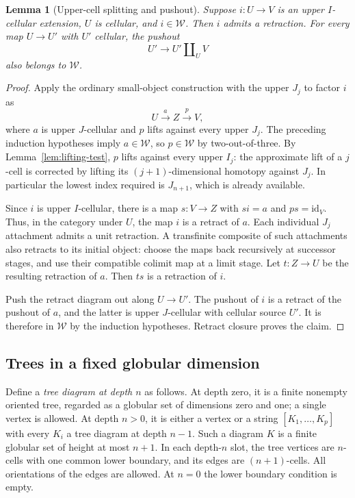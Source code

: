 \documentclass[11pt,letterpaper]{article}
\numberwithin{equation}{section}
\theoremstyle{plain}
\newtheorem{lemma}[theorem]{Lemma}
\theoremstyle{definition}
\theoremstyle{remark}
\newcommand{\id}{\mathrm{id}}
\begin{document}
\begin{lemma}[Upper-cell splitting and pushout]
\label{lem:upper-cell}
Suppose $i:U\to V$ is an upper $I$-cellular extension, $U$ is
cellular, and $i\in\mathcal W$.  Then $i$ admits a retraction.
For every map $U\to U'$ with $U'$ cellular, the pushout
\[
 U'\longrightarrow U'\amalg_U V
\]
also belongs to $\mathcal W$.
\end{lemma}

\begin{proof}
Apply the ordinary small-object construction with the upper
$J_j$ to factor $i$ as
\[
 U\xrightarrow{\,a\,}Z\xrightarrow{\,p\,}V,
\]
where $a$ is upper $J$-cellular and $p$ lifts against every upper
$J_j$.  The preceding induction hypotheses imply $a\in\mathcal W$,
so $p\in\mathcal W$ by two-out-of-three.  By
Lemma~\ref{lem:lifting-test}, $p$ lifts against every upper $I_j$:
the approximate lift of a $j$-cell is corrected by lifting its
$(j+1)$-dimensional homotopy against $J_j$.  In particular the
lowest index required is $J_{n+1}$, which is already available.

Since $i$ is upper $I$-cellular, there is a map $s:V\to Z$ with
$si=a$ and $ps=\id_V$.  Thus, in the category under $U$, the map
$i$ is a retract of $a$.
Each individual $J_j$ attachment admits a unit retraction.  A
transfinite composite of such attachments also retracts to its
initial object: choose the maps back recursively at successor
stages, and use their compatible colimit map at a limit stage.
Let $t:Z\to U$ be the resulting retraction of $a$.  Then $ts$ is
a retraction of $i$.

Push the retract diagram out along $U\to U'$.  The pushout of
$i$ is a retract of the pushout of $a$, and the latter is upper
$J$-cellular with cellular source $U'$.  It is therefore in
$\mathcal W$ by the induction hypotheses.  Retract closure proves
the claim.
\end{proof}

\subsection{Trees in a fixed globular dimension}

Define a \emph{tree diagram at depth $n$} as follows.  At depth zero,
it is a finite nonempty oriented tree, regarded as a globular set
of dimensions zero and one; a single vertex is allowed.  At
depth $n>0$, it is either a vertex or a string
$[K_1,\ldots,K_p]$ with every $K_i$ a tree diagram at depth $n-1$.
Such a diagram $K$ is a finite globular set of height at most
$n+1$.  In each depth-$n$ slot, the tree vertices are $n$-cells
with one common lower boundary, and its edges are $(n+1)$-cells.
All orientations of the edges are allowed.  At $n=0$ the lower
boundary condition is empty.
\end{document}
